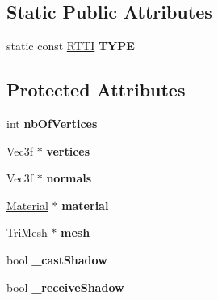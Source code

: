 \subsection*{Static Public Attributes}
\begin{DoxyCompactItemize}
\item 
\hypertarget{class_mesh_renderer_af9376b762b4c96f9e92ebb3bf94458df}{
static const \hyperlink{class_r_t_t_i}{RTTI} {\bfseries TYPE}}
\label{class_mesh_renderer_af9376b762b4c96f9e92ebb3bf94458df}

\end{DoxyCompactItemize}
\subsection*{Protected Attributes}
\begin{DoxyCompactItemize}
\item 
\hypertarget{class_mesh_renderer_ae5987818b394c9677ed984fcd254fc07}{
int {\bfseries nbOfVertices}}
\label{class_mesh_renderer_ae5987818b394c9677ed984fcd254fc07}

\item 
\hypertarget{class_mesh_renderer_a35d178fce64e5ef4c07bbb59706a6b65}{
Vec3f $\ast$ {\bfseries vertices}}
\label{class_mesh_renderer_a35d178fce64e5ef4c07bbb59706a6b65}

\item 
\hypertarget{class_mesh_renderer_a18547492a62a887bc63ae950ed947de7}{
Vec3f $\ast$ {\bfseries normals}}
\label{class_mesh_renderer_a18547492a62a887bc63ae950ed947de7}

\item 
\hypertarget{class_mesh_renderer_a39910329c399dcf516e9e6d3a70e4ce8}{
\hyperlink{class_material}{Material} $\ast$ {\bfseries material}}
\label{class_mesh_renderer_a39910329c399dcf516e9e6d3a70e4ce8}

\item 
\hypertarget{class_mesh_renderer_a75f70932dae889f11d5614ef46ac3d11}{
\hyperlink{class_t_r3_d_1_1_tri_mesh}{TriMesh} $\ast$ {\bfseries mesh}}
\label{class_mesh_renderer_a75f70932dae889f11d5614ef46ac3d11}

\item 
\hypertarget{class_mesh_renderer_a92a86c242532912eebf5cf7dad28e5a2}{
bool {\bfseries \_\-castShadow}}
\label{class_mesh_renderer_a92a86c242532912eebf5cf7dad28e5a2}

\item 
\hypertarget{class_mesh_renderer_a96df19ab2f11f1319803ae0aacb0a8b6}{
bool {\bfseries \_\-receiveShadow}}
\label{class_mesh_renderer_a96df19ab2f11f1319803ae0aacb0a8b6}

\end{DoxyCompactItemize}

